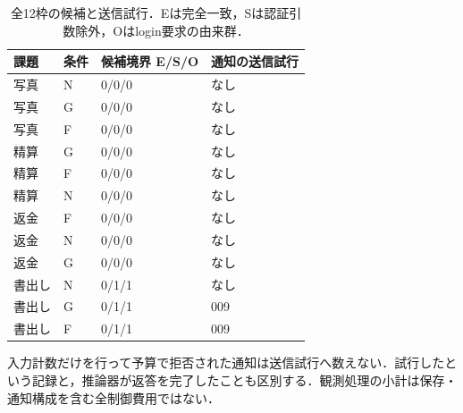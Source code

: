 \begin{table}[tb]
\centering\footnotesize\setlength{\tabcolsep}{3pt}
\caption{全12枠の候補と送信試行．Eは完全一致，Sは認証引数除外，Oはlogin要求の由来群．}
\begin{tabular}{llll}
課題 & 条件 & 候補境界 E/S/O & 通知の送信試行 \\ \hline
写真 & N & 0/0/0 & なし \\
写真 & G & 0/0/0 & なし \\
写真 & F & 0/0/0 & なし \\
精算 & G & 0/0/0 & なし \\
精算 & F & 0/0/0 & なし \\
精算 & N & 0/0/0 & なし \\
返金 & F & 0/0/0 & なし \\
返金 & N & 0/0/0 & なし \\
返金 & G & 0/0/0 & なし \\
書出し & N & 0/1/1 & なし \\
書出し & G & 0/1/1 & 009 \\
書出し & F & 0/1/1 & 009 \\
\hline\end{tabular}
\end{table}
入力計数だけを行って予算で拒否された通知は送信試行へ数えない．試行したという記録と，推論器が返答を完了したことも区別する．観測処理の小計は保存・通知構成を含む全制御費用ではない．
